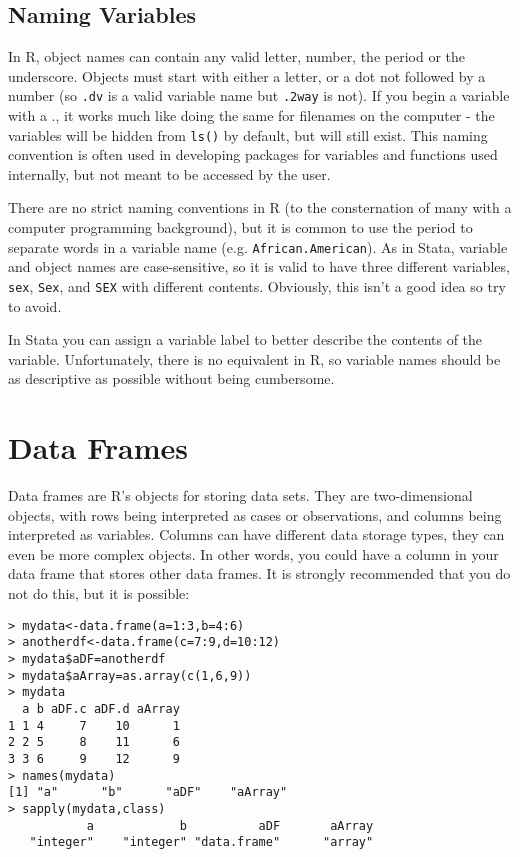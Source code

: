 \documentclass[12pt, oneside]{amsart}   	%
\begin{document}
\subsection{Naming Variables}

In R, object names can contain any valid letter, number, the period or the underscore. Objects must start with either a letter, or a dot not followed by a number (so \texttt{.dv} is a valid variable name but \texttt{.2way} is not). If you begin a variable with a ., it works much like doing the same for filenames on the computer - the variables will be hidden from \texttt{ls()} by default, but will still exist. This naming convention is often used in developing packages for variables and functions used internally, but not meant to be accessed by the user.

There are no strict naming conventions in R (to the consternation of many with a computer programming background), but it is common to use the period to separate words in a variable name (e.g. \texttt{African.American}). As in Stata, variable and object names are case-sensitive, so it is valid to have three different variables, \texttt{sex}, \texttt{Sex}, and \texttt{SEX} with different contents. Obviously, this isn't a good idea so try to avoid. 

In Stata you can assign a variable label to better describe the contents of the variable. Unfortunately, there is no equivalent in R, so variable names should be as descriptive as possible without being cumbersome. 

\section{Data Frames}

Data frames are R's objects for storing data sets. They are two-dimensional objects, with rows being interpreted as cases or observations, and columns being interpreted as variables. Columns can have different data storage types, they can even be more complex objects. In other words, you could have a column in your data frame that stores other data frames. It is strongly recommended that you do not do this, but it is possible:

\begin{verbatim}
> mydata<-data.frame(a=1:3,b=4:6)
> anotherdf<-data.frame(c=7:9,d=10:12)
> mydata$aDF=anotherdf
> mydata$aArray=as.array(c(1,6,9))
> mydata
  a b aDF.c aDF.d aArray
1 1 4     7    10      1
2 2 5     8    11      6
3 3 6     9    12      9
> names(mydata)
[1] "a"      "b"      "aDF"    "aArray"
> sapply(mydata,class)
           a            b          aDF       aArray 
   "integer"    "integer" "data.frame"      "array" 
\end{verbatim}  
\end{document}
